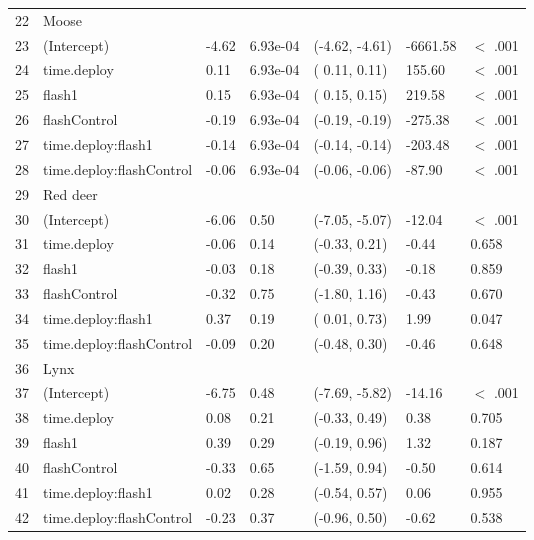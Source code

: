 \begin{table}[ht]
\begin{tabular}{rllllll}
  22 & Moose &  &  &  &  &        \\ 
  23 & (Intercept) & -4.62 & 6.93e-04 & (-4.62, -4.61) & -6661.58 & $<$ .001 \\ 
  24 & time.deploy & 0.11 & 6.93e-04 & ( 0.11,  0.11) & 155.60 & $<$ .001 \\ 
  25 & flash1 & 0.15 & 6.93e-04 & ( 0.15,  0.15) & 219.58 & $<$ .001 \\ 
  26 & flashControl & -0.19 & 6.93e-04 & (-0.19, -0.19) & -275.38 & $<$ .001 \\ 
  27 & time.deploy:flash1 & -0.14 & 6.93e-04 & (-0.14, -0.14) & -203.48 & $<$ .001 \\ 
  28 & time.deploy:flashControl & -0.06 & 6.93e-04 & (-0.06, -0.06) & -87.90 & $<$ .001 \\ 
  29 & Red deer &  &  &  &  &        \\ 
  30 & (Intercept) & -6.06 & 0.50 & (-7.05, -5.07) & -12.04 & $<$ .001 \\ 
  31 & time.deploy & -0.06 & 0.14 & (-0.33,  0.21) & -0.44 & 0.658  \\ 
  32 & flash1 & -0.03 & 0.18 & (-0.39,  0.33) & -0.18 & 0.859  \\ 
  33 & flashControl & -0.32 & 0.75 & (-1.80,  1.16) & -0.43 & 0.670  \\ 
  34 & time.deploy:flash1 & 0.37 & 0.19 & ( 0.01,  0.73) & 1.99 & 0.047  \\ 
  35 & time.deploy:flashControl & -0.09 & 0.20 & (-0.48,  0.30) & -0.46 & 0.648  \\ 
  36 & Lynx &  &  &  &  &        \\ 
  37 & (Intercept) & -6.75 & 0.48 & (-7.69, -5.82) & -14.16 & $<$ .001 \\ 
  38 & time.deploy & 0.08 & 0.21 & (-0.33,  0.49) & 0.38 & 0.705  \\ 
  39 & flash1 & 0.39 & 0.29 & (-0.19,  0.96) & 1.32 & 0.187  \\ 
  40 & flashControl & -0.33 & 0.65 & (-1.59,  0.94) & -0.50 & 0.614  \\ 
  41 & time.deploy:flash1 & 0.02 & 0.28 & (-0.54,  0.57) & 0.06 & 0.955  \\ 
  42 & time.deploy:flashControl & -0.23 & 0.37 & (-0.96,  0.50) & -0.62 & 0.538  \\ 
   \hline
\end{tabular}
\end{table}
